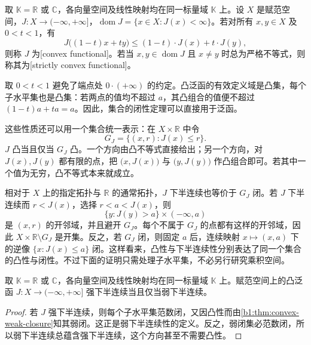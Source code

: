\begin{definition}[凸泛函与严格凸泛函]
\label{b1:def:convex-functional}
取 \(\mathbb K=\mathbb R\) 或 \(\mathbb C\)，各向量空间及线性映射均在同一标量域 \(\mathbb K\) 上。设 \(X\) 是赋范空间，\(J:X\to(-\infty,+\infty]\)，\(\operatorname{dom}J=\{x\in X:J(x)<\infty\}\)。若对所有 \(x,y\in X\) 及 \(0<t<1\)，有
\[
  J\bigl((1-t)x+ty\bigr)\leq(1-t)\cdot J(x)+t\cdot J(y),
\]
则称 \(J\) 为[convex functional]。若当 \(x,y\in\operatorname{dom}J\) 且 \(x\ne y\) 时总为严格不等式，则称其为[strictly convex functional]。
\end{definition}

取 \(0<t<1\) 避免了端点处 \(0\cdot(+\infty)\) 的约定。凸泛函的有效定义域是凸集，每个子水平集也是凸集：若两点的值均不超过 \(a\)，其凸组合的值便不超过 \((1-t)a+ta=a\)。因此，集合的闭性定理可以直接用于泛函。

\ProseParagraphBreak

这些性质还可以用一个集合统一表示：在 \(X\times\mathbb R\) 中令
\[
  G_J=\{(x,r):J(x)\leq r\}.
\]
\(J\) 凸当且仅当 \(G_J\) 凸。一个方向由凸不等式直接给出；另一个方向，对 \(J(x),J(y)\) 都有限的点，把 \(\bigl(x,J(x)\bigr)\) 与 \(\bigl(y,J(y)\bigr)\) 作凸组合即可。若其中一个值为无穷，凸不等式本来就成立。

\ProseParagraphBreak

相对于 \(X\) 上的指定拓扑与 \(\mathbb R\) 的通常拓扑，\(J\) 下半连续也等价于 \(G_J\) 闭。若 \(J\) 下半连续而 \(r<J(x)\)，选择 \(r<a<J(x)\)，则
\[
  \{y:J(y)>a\}\times(-\infty,a)
\]
是 \((x,r)\) 的开邻域，并且避开 \(G_J\)。每个不属于 \(G_J\) 的点都有这样的开邻域，因此 \(X\times\mathbb R\setminus G_J\) 是开集。反之，若 \(G_J\) 闭，则固定 \(a\) 后，连续映射 \(x\mapsto(x,a)\) 下的逆像 \(\{x:J(x)\leq a\}\) 闭。这样看来，凸性与下半连续性分别表达了同一个集合的凸性与闭性。不过下面的证明只需处理子水平集，不必另行研究乘积空间。

\begin{theorem}[凸泛函的两种下半连续性]
\label{b1:thm:convex-weak-lsc}
取 \(\mathbb K=\mathbb R\) 或 \(\mathbb C\)，各向量空间及线性映射均在同一标量域 \(\mathbb K\) 上。赋范空间上的凸泛函 \(J:X\to(-\infty,+\infty]\) 强下半连续当且仅当弱下半连续。
\end{theorem}

\begin{proof}
若 \(J\) 强下半连续，则每个子水平集范数闭，又因凸性而由\cref{b1:thm:convex-weak-closure}知其弱闭。这正是弱下半连续性的定义。反之，弱闭集必范数闭，所以弱下半连续总蕴含强下半连续，这个方向甚至不需要凸性。
\end{proof}

